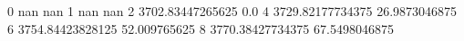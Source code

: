 0 nan nan
1 nan nan
2 3702.83447265625 0.0
4 3729.82177734375 26.9873046875
6 3754.84423828125 52.009765625
8 3770.38427734375 67.5498046875
